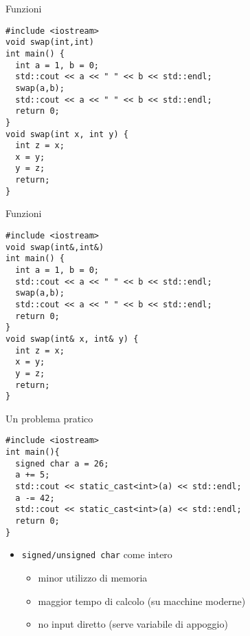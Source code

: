 \begin{frame}[fragile]{Funzioni}
  \vfill
  \begin{lstlisting}
#include <iostream>
void swap(int,int)
int main() {
  int a = 1, b = 0;
  std::cout << a << " " << b << std::endl;
  swap(a,b);
  std::cout << a << " " << b << std::endl;
  return 0;
}
void swap(int x, int y) {
  int z = x;
  x = y;
  y = z;
  return;
}
  \end{lstlisting}
  \vfill
\end{frame}

\begin{frame}[fragile]{Funzioni}
  \vfill
  \begin{lstlisting}
#include <iostream>
void swap(int&,int&)
int main() {
  int a = 1, b = 0;
  std::cout << a << " " << b << std::endl;
  swap(a,b);
  std::cout << a << " " << b << std::endl;
  return 0;
}
void swap(int& x, int& y) {
  int z = x;
  x = y;
  y = z;
  return;
}
  \end{lstlisting}
  \vfill
\end{frame}

\begin{frame}[fragile]{Un problema pratico}
  \vfill
  \begin{lstlisting}
#include <iostream>
int main(){
  signed char a = 26;
  a += 5;
  std::cout << static_cast<int>(a) << std::endl;
  a -= 42;
  std::cout << static_cast<int>(a) << std::endl;
  return 0;
}
  \end{lstlisting}
  \vfill
  \begin{itemize}
    \item \lstinline$signed/unsigned char$ come intero
    \begin{itemize}
      \item minor utilizzo di memoria
      \item maggior tempo di calcolo (su macchine moderne)
      \item no input diretto (serve variabile di appoggio)
    \end{itemize}
  \end{itemize}
  \vfill
\end{frame}
